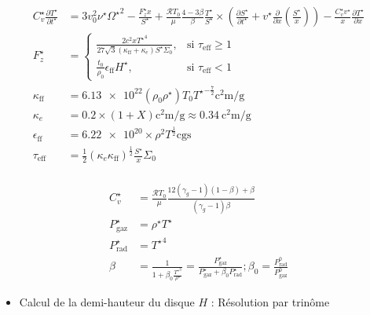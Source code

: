 \documentclass[french]{beamer}
\begin{document}
\begin{frame}
	\begin{equation*}
    \begin{aligned}
    C_v^\star \frac{\partial T^{\star}}{\partial t^{\star}} &=
        3 v_0^2 \nu^\star {\Omega^\star}^2 - \frac{F_z^\star x}{S^\star} +
        \frac{\mathcal{R} T_0}{\mu} \frac{4-3\beta}{\beta} \frac{T^\star}{S^\star} \times
        \left( \frac{\partial S^\star}{\partial t^\star} + v^\star \frac{\partial}{\partial x} \left(\frac{S^\star}{x}\right) \right) -
        \frac{C_v^\star v^\star}{x} \frac{\partial T^\star}{\partial x}\\
        F_z^\star &=
        \begin{cases}
            \frac{2 c^2 x {T^\star}^4}{27 \sqrt{3} (\kappa_\mathrm{ff} + \kappa_e) S^\star \Sigma_0}, &\text{si $\tau_\mathrm{eff} \geq 1$} \\
            \frac{t_0}{\rho_0}\epsilon_\mathrm{ff} H^\star, &\text{si $\tau_\mathrm{eff} < 1$}
        \end{cases} \\
        \kappa_\mathrm{ff} &= \num{6.13e22} (\rho_0 \rho^\star) {T_0 T^\star}^{-\frac{7}{2}} \si{\square\centi\meter\per\gram} \\
        \kappa_e &= 0.2 \times (1 + X) \si{\square\centi\meter\per\gram} \approx \SI{0.34}{\square\centi\meter\per\gram} \\
        \epsilon_\mathrm{ff} &= \num{6.22e20} \times \rho^2 T^\frac{1}{2} \mathrm{cgs} \\
        \tau_\mathrm{eff} &= \frac{1}{2} (\kappa_e \kappa_\mathrm{ff})^\frac{1}{2} \frac{S^\star}{x} \Sigma_0 \\
    \end{aligned}
\end{equation*}
\end{frame} 

\begin{frame}
	\begin{equation*}
    \begin{aligned}
     C_v^\star &= \frac{\mathcal{R} T_0}{\mu} \frac{12 (\gamma_g - 1)(1 - \beta) + \beta}{(\gamma_g - 1) \beta} \\
        P_\mathrm{gaz}^\star &= \rho^\star T^\star \\
        P_\mathrm{rad}^\star &= {T^\star}^4 \\
        \beta &= \frac{1}{1 + \beta_0 \frac{{T^\star}^3}{\rho^\star}} = \frac{P_\mathrm{gaz}^\star}{P_\mathrm{gaz}^\star + \beta_0 P_\mathrm{rad}^\star} ; \beta_0 = \frac{P_\mathrm{rad}^0}{P_\mathrm{gaz}^0}
    \end{aligned}
\end{equation*}

	\begin{itemize}
		\item Calcul de la demi-hauteur du disque $H$ : Résolution par trinôme
	\end{itemize}
	
\end{frame} 
\end{document}
